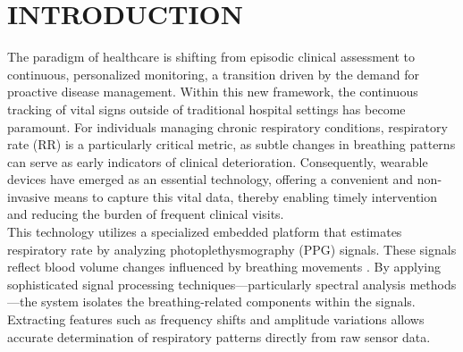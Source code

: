 \documentclass[12pt,a4paper]{report}
\begin{document}
\newpage
\listoftables
{}
\newpage
\listoffigures
{}



   



\newpage
{}
\setcounter{page}{1}
\pagestyle{fancy}
\chead{}
\rhead{}
\cfoot{}
\rfoot{\thepage}
\renewcommand{\headrulewidth}{1pt}
\renewcommand{\footrulewidth}{1pt}
\renewcommand{\chaptername}{ \Large {CHAPTER}}
\chapterfont{\centering}
\renewcommand\bibname{REFERENCES}





\chapter{\Large{INTRODUCTION}}


 The paradigm of healthcare is shifting from episodic clinical assessment to continuous, personalized monitoring, a transition driven by the demand for proactive disease management. Within this new framework, the continuous tracking of vital signs outside of traditional hospital settings has become paramount. For individuals managing chronic respiratory conditions, respiratory rate (RR) is a particularly critical metric, as subtle changes in breathing patterns can serve as early indicators of clinical deterioration. Consequently, wearable devices have emerged as an essential technology, offering a convenient and non-invasive means to capture this vital data, thereby enabling timely intervention and reducing the burden of frequent clinical visits.\\

 This technology utilizes a specialized embedded platform that estimates respiratory rate by analyzing photoplethysmography (PPG) signals. These signals reflect blood volume changes influenced by breathing movements \cite{webster1997design}. By applying sophisticated signal processing techniques—particularly spectral analysis methods—the system isolates the breathing-related components within the signals. Extracting features such as frequency shifts and amplitude variations allows accurate determination of respiratory patterns directly from raw sensor data.\\
\end{document}
